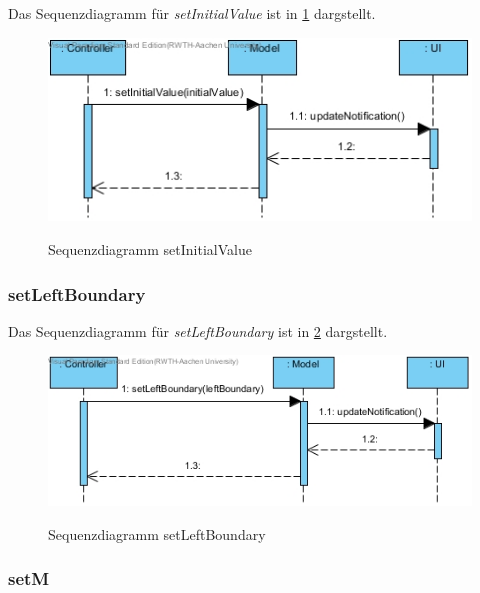 Das Sequenzdiagramm für \emph{setInitialValue} ist in \ref{Sequenzdiagramm setInitialValue} dargstellt.

\begin{figure}[H]
	\centering
	\includegraphics[scale=.6]{Bilder/Model__setInitialValue().jpg}\\
	\caption{Sequenzdiagramm setInitialValue}
	\label{Sequenzdiagramm setInitialValue}
\end{figure}

\subsubsection*{setLeftBoundary}

Das Sequenzdiagramm für \emph{setLeftBoundary} ist in \ref{Sequenzdiagramm setLeftBoundary} dargstellt.

\begin{figure}[H]
	\centering
	\includegraphics[scale=.6]{Bilder/Model__setLeftBoundary().jpg}\\
	\caption{Sequenzdiagramm setLeftBoundary}
	\label{Sequenzdiagramm setLeftBoundary}
\end{figure}


\subsubsection*{setM}

